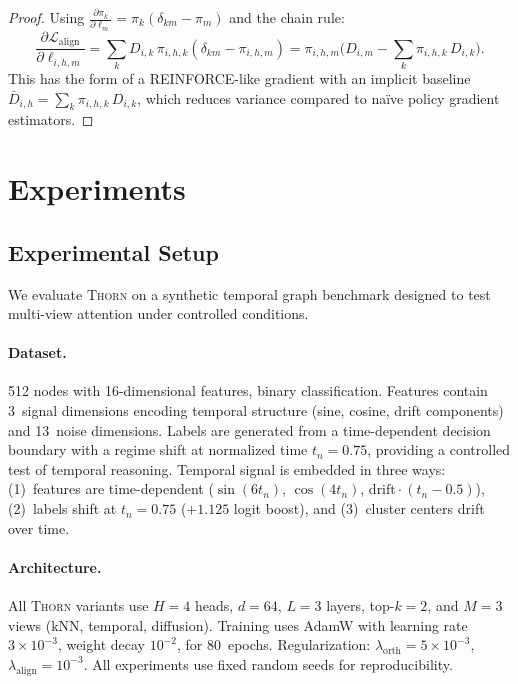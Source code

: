 \documentclass[11pt,a4paper]{article}
\newcommand{\thorn}{\textsc{Thorn}}
\newcommand{\calL}{\mathcal{L}}
\begin{document}
\begin{proof}
  Using $\frac{\partial \pi_k}{\partial \ell_m} =
  \pi_k(\delta_{km} - \pi_m)$ and the chain rule:
  \begin{equation}
    \frac{\partial \calL_{\mathrm{align}}}{\partial \ell_{i,h,m}}
    = \sum_k D_{i,k}\, \pi_{i,h,k}(\delta_{km} - \pi_{i,h,m})
    = \pi_{i,h,m}\Big(D_{i,m} - \sum_k \pi_{i,h,k}\, D_{i,k}\Big).
  \end{equation}
  This has the form of a REINFORCE-like gradient with an implicit
  baseline $\bar{D}_{i,h} = \sum_k \pi_{i,h,k}\, D_{i,k}$, which
  reduces variance compared to na\"ive policy gradient estimators.
\end{proof}

\section{Experiments}
\label{sec:experiments}

\subsection{Experimental Setup}
\label{sec:setup}

We evaluate \thorn{} on a synthetic temporal graph benchmark designed
to test multi-view attention under controlled conditions.

\paragraph{Dataset.}
512 nodes with 16-dimensional features, binary classification.
Features contain 3~signal dimensions encoding temporal structure
(sine, cosine, drift components) and 13~noise dimensions.
Labels are generated from a time-dependent decision boundary with a
regime shift at normalized time $t_n = 0.75$, providing a controlled
test of temporal reasoning.
Temporal signal is embedded in three ways:
(1)~features are time-dependent ($\sin(6t_n)$, $\cos(4t_n)$,
$\text{drift} \cdot (t_n - 0.5)$),
(2)~labels shift at $t_n = 0.75$ ($+1.125$ logit boost), and
(3)~cluster centers drift over time.

\paragraph{Architecture.}
All \thorn{} variants use $H = 4$ heads, $d = 64$, $L = 3$ layers,
top-$k = 2$, and $M = 3$ views (kNN, temporal, diffusion).
Training uses AdamW with learning rate $3 \times 10^{-3}$,
weight decay $10^{-2}$, for 80~epochs.
Regularization: $\lambda_{\mathrm{orth}} = 5 \times 10^{-3}$,
$\lambda_{\mathrm{align}} = 10^{-3}$.
All experiments use fixed random seeds for reproducibility.
\end{document}

